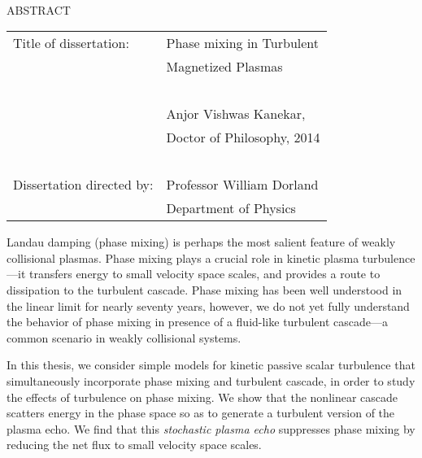 \hbox{\ }

\renewcommand{\baselinestretch}{1}
\small \normalsize

\begin{center}
\large{{ABSTRACT}} 

\vspace{3em} 

\end{center}
\hspace{-.15in}
\begin{tabular}{ll}
Title of dissertation:    & {\large  Phase mixing in Turbulent}\\
&                          {\large   Magnetized Plasmas } \\
\ \\
&                          {\large  Anjor Vishwas Kanekar, } \\
&                          {\large  Doctor of Philosophy, 2014 } \\
\ \\
Dissertation directed by: & {\large  Professor William Dorland} \\
&  				{\large	 Department of Physics } \\
\end{tabular}

\vspace{3em}

\renewcommand{\baselinestretch}{2}
\large \normalsize

Landau damping (phase mixing) is perhaps the most salient feature of weakly collisional 
plasmas. Phase mixing plays a crucial role in kinetic plasma turbulence---it transfers
energy to small velocity space scales, and provides a route to dissipation to the
turbulent cascade. Phase mixing has been well understood in the linear limit for nearly
seventy years, however, we do not yet fully understand the behavior of phase mixing
in presence of a fluid-like turbulent cascade---a common scenario in weakly
collisional systems.

In this thesis, we consider simple models for kinetic passive scalar turbulence that simultaneously incorporate
phase mixing and turbulent cascade, in order to study the effects of turbulence on phase mixing.
 We show that the nonlinear cascade scatters energy in the phase space
so as to generate a turbulent version of the plasma echo.
We find that this \textit{stochastic
plasma echo} suppresses phase mixing by reducing the net flux to
small velocity space scales.

